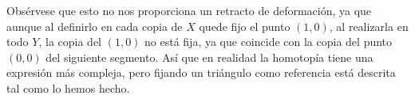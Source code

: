 \documentclass[twoside]{article}
\begin{document}
Obsérvese que esto no nos proporciona un retracto de deformación, ya que aunque al definirlo en cada copia de $X$ quede fijo el punto $(1,0)$, al realizarla en todo $Y$, la copia del $(1,0)$ no está fija, ya que coincide con la copia del punto $(0,0)$ del siguiente segmento. Así que en realidad la homotopía tiene una expresión más compleja, pero fijando un triángulo como referencia está descrita tal como lo hemos hecho. 



%
%
%
%
%
%
%
%
%
%
%
%
%
%
%
%
%
%
%
%
%
%
%
%
%
%
%
%
%
%
\end{document}
